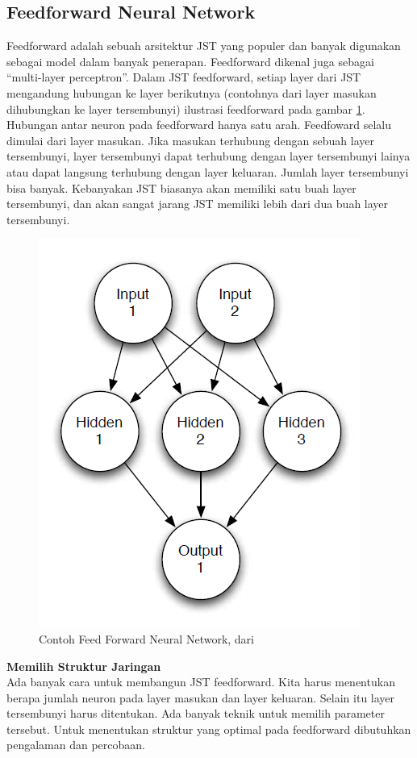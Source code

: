\subsection{Feedforward Neural Network}
Feedforward adalah sebuah arsitektur JST yang populer dan banyak digunakan sebagai model dalam banyak penerapan. Feedforward dikenal juga sebagai ``multi-layer perceptron''. Dalam JST feedforward, setiap layer dari JST mengandung hubungan ke layer berikutnya (contohnya dari layer masukan dihubungkan ke layer tersembunyi) ilustrasi feedforward pada gambar \ref{fig:ffnn}. Hubungan antar neuron pada feedforward hanya satu arah. Feedfoward selalu dimulai dari layer masukan. Jika masukan terhubung dengan sebuah layer tersembunyi, layer tersembunyi dapat terhubung dengan layer tersembunyi lainya atau dapat langsung terhubung dengan layer keluaran. Jumlah layer tersembunyi bisa banyak. Kebanyakan JST biasanya akan memiliki satu buah layer tersembunyi, dan akan sangat jarang JST memiliki lebih dari dua buah layer tersembunyi.\\
\begin{figure}
	\centering
	\includegraphics[width=0.6\linewidth]{Gambar/mine/ffnn}
	\caption[Contoh Feed Forward Neural Network, dari \cite{IntroNNforJava:2015}]{Contoh Feed Forward Neural Network, dari \cite{IntroNNforJava:2015}} 
	\label{fig:ffnn}
	\end{figure}
\textbf{Memilih Struktur Jaringan}\\
Ada banyak cara untuk membangun JST feedforward. Kita harus menentukan berapa jumlah neuron pada layer masukan dan layer keluaran. Selain itu layer tersembunyi harus ditentukan. Ada banyak teknik untuk memilih parameter tersebut. Untuk menentukan struktur yang optimal pada feedforward dibutuhkan pengalaman dan percobaan.
